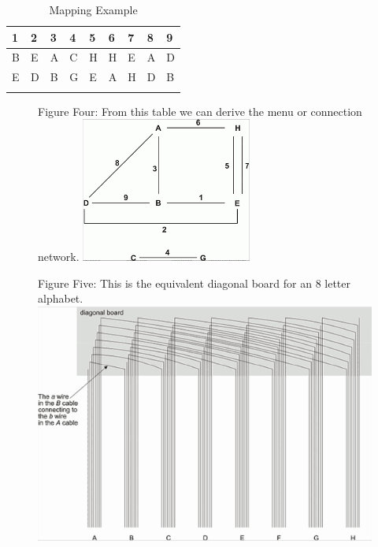 \documentclass[12pt,a4paper]{article}
\begin{document}
\label{Crib and Ciphertext}
\begin{longtable}{ |p{1.25cm}|p{1.25cm}|p{1.25cm}|p{1.25cm}|p{1.25cm}|p{1.25cm}|p{1.25cm}|p{1.25cm}|p{1.25cm}| }\hline
1 & 2 & 3 & 4 & 5 & 6 & 7 & 8 & 9 \\ \hline\hline
B & E & A & C & H & H & E & A & D \\ \hline
E & D & B & G & E & A & H & D & B \\ \hline
\caption{Mapping Example}
\end{longtable}

\begin{figure}[H]
\centering
Figure Four: 
From this table we can derive the menu or connection network.
\includegraphics[width=0.5\textwidth]{BOMBEone.png}
\end{figure}

\begin{figure}[H]
\centering
Figure Five: 
This is the equivalent diagonal board for an 8 letter alphabet.
\includegraphics[width=\textwidth]{BOMBEtwo.png}
\end{figure}
\end{document}
